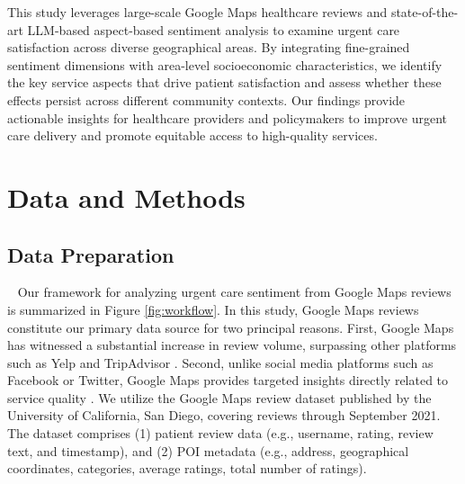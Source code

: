 \documentclass[journal,twoside,web]{ieeecolor}
\begin{document}
This study leverages large-scale Google Maps healthcare reviews and state-of-the-art LLM-based aspect-based sentiment analysis to examine urgent care satisfaction across diverse geographical areas. By integrating fine-grained sentiment dimensions with area-level socioeconomic characteristics, we identify the key service aspects that drive patient satisfaction and assess whether these effects persist across different community contexts. Our findings provide actionable insights for healthcare providers and policymakers to improve urgent care delivery and promote equitable access to high-quality services.


\section{Data and Methods}

\subsection{Data Preparation} 
Our framework for analyzing urgent care sentiment from Google Maps reviews is summarized in Figure \ref{fig:workflow}. In this study, Google Maps reviews constitute our primary data source for two principal reasons. First, Google Maps has witnessed a substantial increase in review volume, surpassing other platforms such as Yelp and TripAdvisor \cite{munawir2019visitor}. Second, unlike social media platforms such as Facebook or Twitter, Google Maps provides targeted insights directly related to service quality \cite{yum2024enhancing}. We utilize the Google Maps review dataset \cite{li2022uctopic,yan2023personalized} published by the University of California, San Diego, covering reviews through September 2021. The dataset comprises (1) patient review data (e.g., username, rating, review text, and timestamp), and (2) POI metadata (e.g., address, geographical coordinates, categories, average ratings, total number of ratings).
\end{document}
